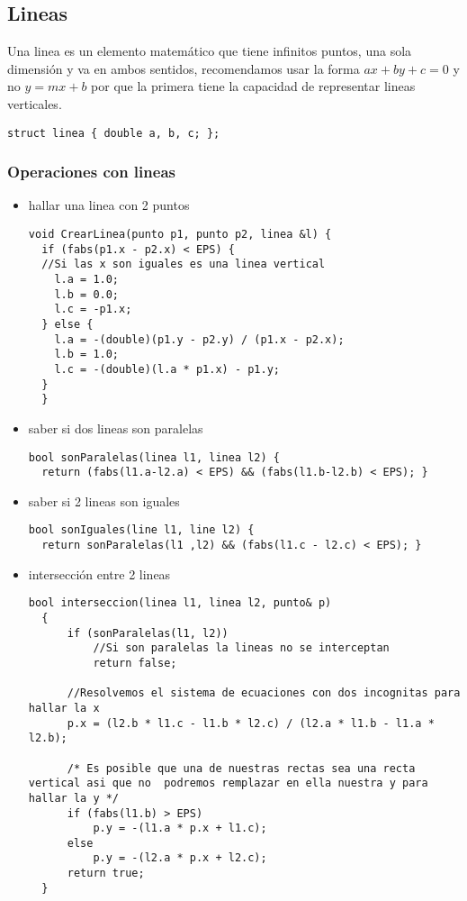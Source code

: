 \subsection{Lineas}
Una linea es un elemento matemático que tiene infinitos puntos, una sola dimensión y va en ambos sentidos, recomendamos usar
la forma $ax+by+c=0$ y no $y=mx+b$ por que la primera tiene la capacidad de representar lineas verticales.
\begin{lstlisting}[style=C]
struct linea { double a, b, c; };
\end{lstlisting}
\subsubsection{Operaciones con lineas}
\begin{itemize}
  \item hallar una linea con 2 puntos
  \\
  \begin{lstlisting}[style=C]
  void CrearLinea(punto p1, punto p2, linea &l) {
  if (fabs(p1.x - p2.x) < EPS) {
  //Si las x son iguales es una linea vertical
    l.a = 1.0;
    l.b = 0.0;
    l.c = -p1.x;
  } else {
    l.a = -(double)(p1.y - p2.y) / (p1.x - p2.x);
    l.b = 1.0;
    l.c = -(double)(l.a * p1.x) - p1.y;
  }
  }
  \end{lstlisting}
  \item saber si dos lineas son paralelas
  \\
  \begin{lstlisting}[style=C]
  bool sonParalelas(linea l1, linea l2) {
  return (fabs(l1.a-l2.a) < EPS) && (fabs(l1.b-l2.b) < EPS); }
  \end{lstlisting}
  \item saber si 2 lineas son iguales
  \\
  \begin{lstlisting}[style=C]
  bool sonIguales(line l1, line l2) {
  return sonParalelas(l1 ,l2) && (fabs(l1.c - l2.c) < EPS); }
  \end{lstlisting}
  \item intersección entre 2 lineas
  \\
  \begin{lstlisting}[style=C]
  bool interseccion(linea l1, linea l2, punto& p)
  {
      if (sonParalelas(l1, l2))
          //Si son paralelas la lineas no se interceptan
          return false;

      //Resolvemos el sistema de ecuaciones con dos incognitas para hallar la x
      p.x = (l2.b * l1.c - l1.b * l2.c) / (l2.a * l1.b - l1.a * l2.b);

      /* Es posible que una de nuestras rectas sea una recta vertical asi que no  podremos remplazar en ella nuestra y para hallar la y */
      if (fabs(l1.b) > EPS)
          p.y = -(l1.a * p.x + l1.c);
      else
          p.y = -(l2.a * p.x + l2.c);
      return true;
  }
  \end{lstlisting}
\end{itemize}
